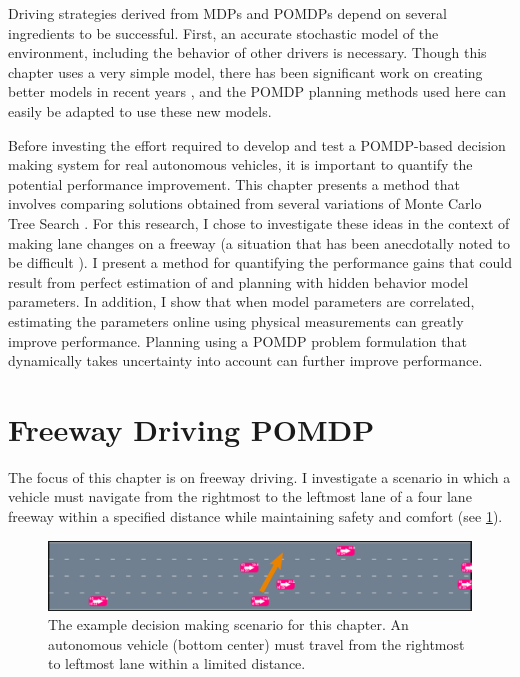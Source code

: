 Driving strategies derived from MDPs and POMDPs depend on several ingredients to be successful.
First, an accurate stochastic model of the environment, including the behavior of other drivers is necessary. 
Though this chapter uses a very simple model, there has been significant work on creating better models in recent years \cite{grindele2015trafficmodel, WheelerRobbelKochenderfer2015, sadigh2014}, and the POMDP planning methods used here can easily be adapted to use these new models.

Before investing the effort required to develop and test a POMDP-based decision making system for real autonomous vehicles, it is important to quantify the potential performance improvement.
This chapter presents a method that involves comparing solutions obtained from several variations of Monte Carlo Tree Search \cite{browne2012mcts}.
For this research, I chose to investigate these ideas in the context of making lane changes on a freeway (a situation that has been anecdotally noted to be difficult \cite{naughton2015freeway}).
I present a method for quantifying the performance gains that could result from perfect estimation of and planning with hidden behavior model parameters.
In addition, I show that when model parameters are correlated, estimating the parameters online using physical measurements can greatly improve performance. Planning using a POMDP problem formulation that dynamically takes uncertainty into account can further improve performance.

\section{Freeway Driving POMDP}

The focus of this chapter is on freeway driving.
I investigate a scenario in which a vehicle must navigate from the rightmost to the leftmost lane of a four lane freeway within a specified distance while maintaining safety and comfort (see \cref{fig:scene}).

\begin{figure}[tb]
    \centering
    \includegraphics[width=\columnwidth]{media/scene.png}
    \caption[Lane changing scenario]{The example decision making scenario for this chapter. An autonomous vehicle (bottom center) must travel from the rightmost to leftmost lane within a limited distance.}
    \label{fig:scene}
\end{figure}

